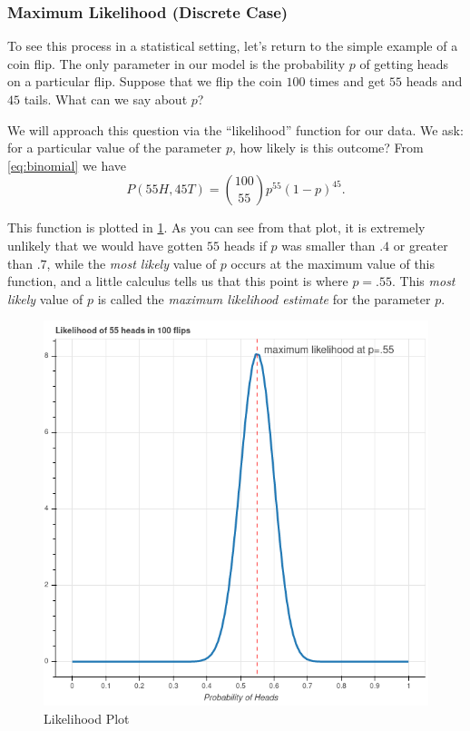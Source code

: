 \documentclass[
]{article}
\begin{document}
\hypertarget{sec:mlcoin}{%
\subsubsection{Maximum Likelihood (Discrete Case)}\label{sec:mlcoin}}

To see this process in a statistical setting, let's return to the simple
example of a coin flip. The only parameter in our model is the
probability \(p\) of getting heads on a particular flip. Suppose that we
flip the coin \(100\) times and get \(55\) heads and \(45\) tails. What
can we say about \(p\)?

We will approach this question via the ``likelihood'' function for our
data. We ask: for a particular value of the parameter \(p\), how likely
is this outcome? From \cref{eq:binomial} we have \[
P(55H,45T)=\binom{100}{55}p^{55}(1-p)^{45}.
\]

This function is plotted in \cref{fig:beta}. As you can see from that
plot, it is extremely unlikely that we would have gotten \(55\) heads if
\(p\) was smaller than \(.4\) or greater than \(.7\), while the
\emph{most likely} value of \(p\) occurs at the maximum value of this
function, and a little calculus tells us that this point is where
\(p=.55\). This \emph{most likely} value of \(p\) is called the
\emph{maximum likelihood estimate} for the parameter \(p\).

\begin{figure}
\hypertarget{fig:beta}{%
\centering
\includegraphics{../img/beta.png}
\caption{Likelihood Plot}\label{fig:beta}
}
\end{figure}
\end{document}
